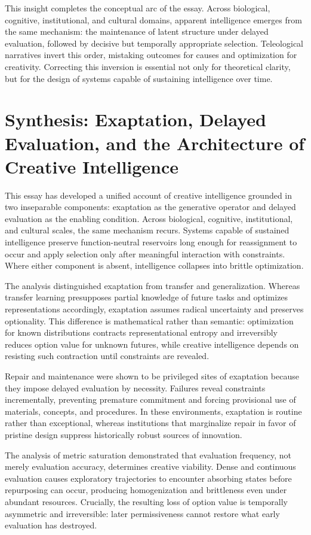 \documentclass[11pt]{article}
\theoremstyle{definition}
\begin{document}
This insight completes the conceptual arc of the essay. Across biological, cognitive, institutional, and cultural domains, apparent intelligence emerges from the same mechanism: the maintenance of latent structure under delayed evaluation, followed by decisive but temporally appropriate selection. Teleological narratives invert this order, mistaking outcomes for causes and optimization for creativity. Correcting this inversion is essential not only for theoretical clarity, but for the design of systems capable of sustaining intelligence over time.

\section{Synthesis: Exaptation, Delayed Evaluation, and the Architecture of Creative Intelligence}

This essay has developed a unified account of creative intelligence grounded in two inseparable components: exaptation as the generative operator and delayed evaluation as the enabling condition. Across biological, cognitive, institutional, and cultural scales, the same mechanism recurs. Systems capable of sustained intelligence preserve function-neutral reservoirs long enough for reassignment to occur and apply selection only after meaningful interaction with constraints. Where either component is absent, intelligence collapses into brittle optimization.

The analysis distinguished exaptation from transfer and generalization. Whereas transfer learning presupposes partial knowledge of future tasks and optimizes representations accordingly, exaptation assumes radical uncertainty and preserves optionality. This difference is mathematical rather than semantic: optimization for known distributions contracts representational entropy and irreversibly reduces option value for unknown futures, while creative intelligence depends on resisting such contraction until constraints are revealed.

Repair and maintenance were shown to be privileged sites of exaptation because they impose delayed evaluation by necessity. Failures reveal constraints incrementally, preventing premature commitment and forcing provisional use of materials, concepts, and procedures. In these environments, exaptation is routine rather than exceptional, whereas institutions that marginalize repair in favor of pristine design suppress historically robust sources of innovation.

The analysis of metric saturation demonstrated that evaluation frequency, not merely evaluation accuracy, determines creative viability. Dense and continuous evaluation causes exploratory trajectories to encounter absorbing states before repurposing can occur, producing homogenization and brittleness even under abundant resources. Crucially, the resulting loss of option value is temporally asymmetric and irreversible: later permissiveness cannot restore what early evaluation has destroyed.
\end{document}
